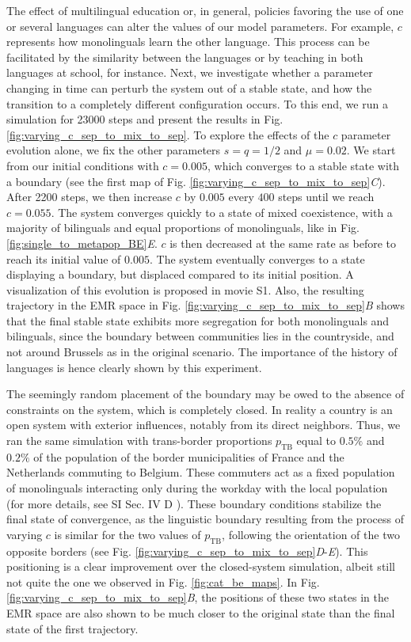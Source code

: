 \documentclass[../thesis.tex]{subfiles}
\begin{document}
The effect of multilingual education or, in general, policies favoring the use of one or
several languages can alter the values of our model parameters. For example, $c$
represents how monolinguals learn the other language. This process can be facilitated by
the similarity between the languages or by teaching in both languages at school, for
instance. Next, we investigate whether a parameter changing in time can perturb the
system out of a stable state, and how the transition to a completely different
configuration occurs. To this end, we run a simulation for 23000 steps and present the
results in Fig. \ref{fig:varying_c_sep_to_mix_to_sep}. To explore the effects of the $c$
parameter evolution alone, we fix the other parameters $s = q = 1/2$ and $\mu = 0.02$.
We start from our initial conditions with $c = 0.005$, which converges to a stable state
with a boundary (see the first map of Fig.
\ref{fig:varying_c_sep_to_mix_to_sep}\textit{C}). After 2200 steps, we then increase $c$
by $0.005$ every $400$ steps until we reach $c = 0.055$. The system converges quickly to
a state of mixed coexistence, with a majority of bilinguals and equal proportions of
monolinguals, like in Fig. \ref{fig:single_to_metapop_BE}\textit{E}. $c$ is then
decreased at the same rate as before to reach its initial value of $0.005$. The system
eventually converges to a state displaying a boundary, but displaced compared to its
initial position. A visualization of this evolution is proposed in movie S1. Also, the
resulting trajectory in the EMR space in Fig.
\ref{fig:varying_c_sep_to_mix_to_sep}\textit{B} shows that the final stable state
exhibits more segregation for both monolinguals and bilinguals, since the boundary
between communities lies in the countryside, and not around Brussels as in the original
scenario. The importance of the history of languages is hence clearly shown by this
experiment.

The seemingly random placement of the boundary may be owed to the absence of constraints
on the system, which is completely closed. In reality a country is an open system with
exterior influences, notably from its direct neighbors. Thus, we ran the same simulation
with trans-border proportions $p_{\text{TB}}$ equal to $0.5\%$ and $0.2\%$ of the
population of the border municipalities of France and the Netherlands commuting to
Belgium. These commuters act as a fixed population of monolinguals interacting only
during the workday with the local population (for more details, see SI Sec. IV D
\cite{supp}). These boundary conditions stabilize the final state of convergence, as the
linguistic boundary resulting from the process of varying $c$ is similar for the two
values of $p_{\text{TB}}$, following the orientation of the two opposite borders (see
Fig. \ref{fig:varying_c_sep_to_mix_to_sep}\textit{D}-\textit{E}). This positioning is a
clear improvement over the closed-system simulation, albeit still not quite the one we
observed in Fig. \ref{fig:cat_be_maps}. In Fig.
\ref{fig:varying_c_sep_to_mix_to_sep}\textit{B}, the positions of these two states in
the EMR space are also shown to be much closer to the original state than the final
state of the first trajectory.
\end{document}
